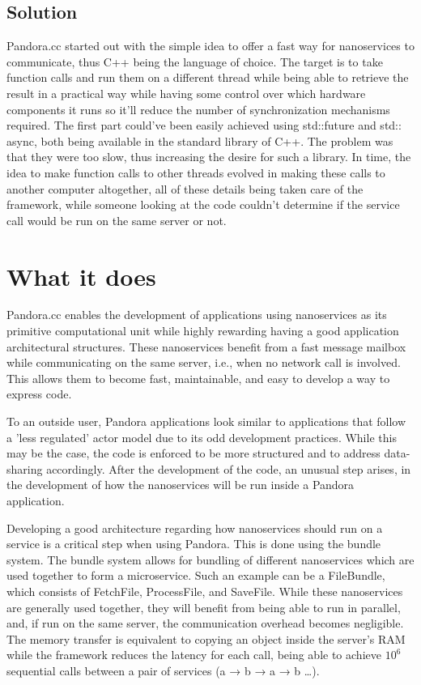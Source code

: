 \subsection*{Solution} Pandora.cc started out with the simple idea to offer a fast way for nanoservices to communicate, thus C++ being the language of choice. The target is to take function calls and run them on a different thread while being able to retrieve the result in a practical way while having some control over which hardware components it runs so it'll reduce the number of synchronization mechanisms required. The first part could've been easily achieved using std::future and std:: async, both being available in the standard library of C++. The problem was that they were too slow, thus increasing the desire for such a library. In time, the idea to make function calls to other threads evolved in making these calls to another computer altogether, all of these details being taken care of the framework, while someone looking at the code couldn't determine if the service call would be run on the same server or not.

\section{What it does}
Pandora.cc enables the development of applications using nanoservices as its primitive computational unit while highly rewarding having a good application architectural structures. These nanoservices benefit from a fast message mailbox while communicating on the same server, i.e., when no network call is involved. This allows them to become fast, maintainable, and easy to develop a way to express code.

To an outside user, Pandora applications look similar to applications that follow a 'less regulated' actor model due to its odd development practices. While this may be the case, the code is enforced to be more structured and to address data-sharing accordingly. After the development of the code, an unusual step arises, in the development of how the nanoservices will be run inside a Pandora application.

Developing a good architecture regarding how nanoservices should run on a service is a critical step when using Pandora. This is done using the bundle system. The bundle system allows for bundling of different nanoservices which are used together to form a microservice.
Such an example can be a FileBundle, which consists of FetchFile, ProcessFile, and SaveFile. While these nanoservices are generally used together, they will benefit from being able to run in parallel, and, if run on the same server, the communication overhead becomes negligible. The memory transfer is equivalent to copying an object inside the server's RAM while the framework reduces the latency for each call, being able to achieve $10^6$ sequential calls between a pair of services (a → b → a → b …).

